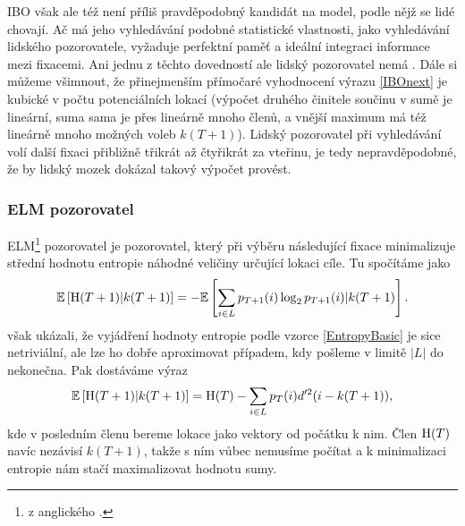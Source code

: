 IBO však ale též není příliš pravděpodobný  kandidát na model, podle nějž se
lidé chovají.  Ač má jeho vyhledávání podobné statistické vlastnosti, jako
vyhledávání lidského pozorovatele, vyžaduje perfektní paměť a ideální integraci
informace mezi fixacemi. Ani jednu z těchto dovedností ale lidský pozorovatel
nemá \citep{Najemnik08}. Dále si můžeme všimnout, že přinejmenším přímočaré
vyhodnocení výrazu \eqref{IBOnext} je kubické v počtu potenciálních
lokací (výpočet druhého činitele součinu v sumě je lineární, suma sama je přes
lineárně mnoho členů, a vnější maximum má též lineárně mnoho možných voleb
$k(T+1)$). Lidský pozorovatel při vyhledávání volí další fixaci přibližně
třikrát až čtyřikrát za vteřinu, je tedy nepravděpodobné, že by lidský mozek
dokázal takový výpočet provést. 

\subsubsection{ELM pozorovatel}

ELM\footnote{z anglického .} pozorovatel je
pozorovatel, který při výběru následující fixace minimalizuje střední hodnotu
entropie náhodné veličiny určující lokaci cíle. Tu spočítáme jako
\begin{equation}\label{EntropyBasic}\mathbb{E}\left[\operatorname{H}(T+1)|k(T+1)\right]=-\mathbb{E}\left[\displaystyle\sum_{i\in
L}p_{T+1}(i)\log_2p_{T+1}(i)|k(T+1)\right].\end{equation} \citet{Najemnik09} však ukázali,
že vyjádření hodnoty entropie podle vzorce \eqref{EntropyBasic} je sice
netriviální, ale lze ho dobře aproximovat případem, kdy pošleme v limitě $|L|$
do nekonečna. Pak dostáváme výraz $$ \mathbb{E}\left[\operatorname{H}(T+1)|k(T+1)\right]= \operatorname{H}(T) -
\displaystyle\sum_{i\in L} p_T(i)d'^2(i-k(T+1)),$$ kde v posledním členu bereme
lokace jako vektory od počátku k nim. Člen $\operatorname{H}(T)$ navíc nezávisí $k(T+1)$,
takže s ním vůbec nemusíme počítat a k minimalizaci entropie nám stačí
maximalizovat hodnotu sumy. 

